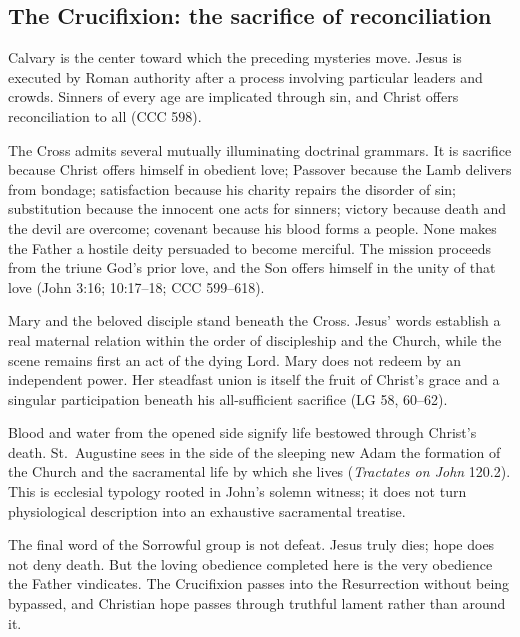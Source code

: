 \subsection{The Crucifixion: the sacrifice of reconciliation}


Calvary is the center toward which the preceding mysteries move. Jesus is executed by Roman authority after a process involving particular leaders and crowds. Sinners of every age are implicated through sin, and Christ offers reconciliation to all (CCC 598).

The Cross admits several mutually illuminating doctrinal grammars. It is sacrifice because Christ offers himself in obedient love; Passover because the Lamb delivers from bondage; satisfaction because his charity repairs the disorder of sin; substitution because the innocent one acts for sinners; victory because death and the devil are overcome; covenant because his blood forms a people. None makes the Father a hostile deity persuaded to become merciful. The mission proceeds from the triune God's prior love, and the Son offers himself in the unity of that love (John 3:16; 10:17--18; CCC 599--618).

Mary and the beloved disciple stand beneath the Cross. Jesus' words establish a real maternal relation within the order of discipleship and the Church, while the scene remains first an act of the dying Lord. Mary does not redeem by an independent power. Her steadfast union is itself the fruit of Christ's grace and a singular participation beneath his all-sufficient sacrifice (LG 58, 60--62).

Blood and water from the opened side signify life bestowed through Christ's death. St.~Augustine sees in the side of the sleeping new Adam the formation of the Church and the sacramental life by which she lives (\emph{Tractates on John} 120.2). This is ecclesial typology rooted in John's solemn witness; it does not turn physiological description into an exhaustive sacramental treatise.

The final word of the Sorrowful group is not defeat. Jesus truly dies; hope does not deny death. But the loving obedience completed here is the very obedience the Father vindicates. The Crucifixion passes into the Resurrection without being bypassed, and Christian hope passes through truthful lament rather than around it.

